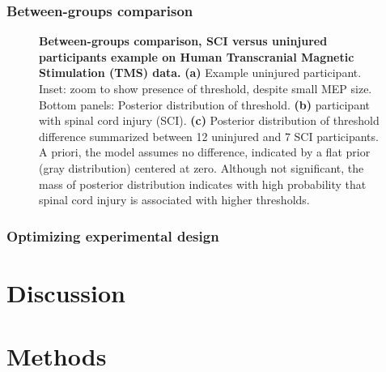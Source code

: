 \documentclass[pdflatex,sn-mathphys-ay]{sn-jnl}%
\numberwithin{equation}{subsection}
\theoremstyle{thmstyleone}%
\theoremstyle{thmstyletwo}%
\theoremstyle{thmstylethree}%
\begin{document}
\subsubsection{Between-groups comparison}
\begin{figure}[h]
    \centering
    \caption{\textbf{Between-groups comparison, SCI versus uninjured participants example on Human Transcranial Magnetic Stimulation (TMS) data.} \textbf{(a)} Example uninjured participant. Inset: zoom to show presence of threshold, despite small MEP size. Bottom panels: Posterior distribution of threshold. \textbf{(b)} participant with spinal cord injury (SCI). \textbf{(c)} Posterior distribution of threshold difference summarized between 12 uninjured and 7 SCI participants. A priori, the model assumes no difference, indicated by a flat prior (gray distribution) centered at zero. Although not significant, the mass of posterior distribution indicates with high probability that spinal cord injury is associated with higher thresholds.}\label{fig-between}
\end{figure}

\subsubsection{Optimizing experimental design}

\section{Discussion}\label{discussion}

\section{Methods}\label{methods}
\end{document}
